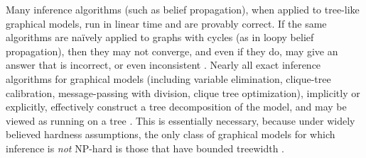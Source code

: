 \documentclass{article}
\begin{document}
Many inference algorithms (such as belief propagation),
when applied to tree-like graphical models,
run in linear time and are provably correct.
If the same algorithms are na{\"i}vely applied to graphs with cycles (as in loopy belief propagation),
then they may not converge, and even if they do,
may give an answer that is incorrect, or even inconsistent \parencite{wainwright2008graphical}.
Nearly all exact inference algorithms for graphical models (including variable elimination, clique-tree calibration, message-passing with division, clique tree optimization),
implicitly or explicitly, effectively construct a tree decomposition of the model, and may be viewed as running on a tree \parencite[\S9-11]{koller2009probabilistic}.
This is essentially necessary, because under widely believed
hardness assumptions, the only class of graphical models for which inference is \emph{not} NP-hard is those that have bounded treewidth \parencite{chandrasekaran2012complexity}.
\end{document}
